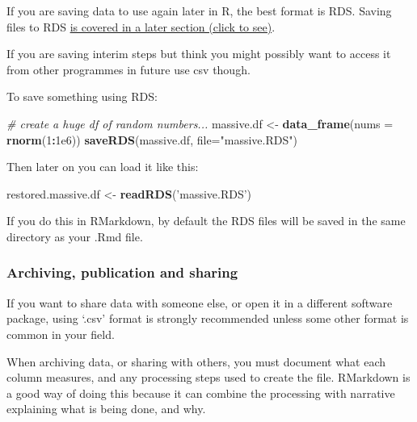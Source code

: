 \documentclass[]{article}
\newenvironment{Shaded}{\begin{snugshade}}{\end{snugshade}}
\newcommand{\CommentTok}[1]{\textcolor[rgb]{0.56,0.35,0.01}{\textit{#1}}}
\newcommand{\DataTypeTok}[1]{\textcolor[rgb]{0.13,0.29,0.53}{#1}}
\newcommand{\DecValTok}[1]{\textcolor[rgb]{0.00,0.00,0.81}{#1}}
\newcommand{\FloatTok}[1]{\textcolor[rgb]{0.00,0.00,0.81}{#1}}
\newcommand{\KeywordTok}[1]{\textcolor[rgb]{0.13,0.29,0.53}{\textbf{#1}}}
\newcommand{\NormalTok}[1]{#1}
\newcommand{\OperatorTok}[1]{\textcolor[rgb]{0.81,0.36,0.00}{\textbf{#1}}}
\newcommand{\StringTok}[1]{\textcolor[rgb]{0.31,0.60,0.02}{#1}}
\begin{document}
If you are saving data to use again later in R, the best format is RDS. Saving
files to RDS \protect\hyperlink{rds-files}{is covered in a later section (click to see)}.

If you are saving interim steps but think you might possibly want to access it
from other programmes in future use csv though.

To save something using RDS:

\begin{Shaded}
\begin{Highlighting}[]
\CommentTok{# create a huge df of random numbers...}
\NormalTok{massive.df <-}\StringTok{ }\KeywordTok{data_frame}\NormalTok{(}\DataTypeTok{nums =} \KeywordTok{rnorm}\NormalTok{(}\DecValTok{1}\OperatorTok{:}\FloatTok{1e6}\NormalTok{))}
\KeywordTok{saveRDS}\NormalTok{(massive.df, }\DataTypeTok{file=}\StringTok{"massive.RDS"}\NormalTok{)}
\end{Highlighting}
\end{Shaded}

Then later on you can load it like this:

\begin{Shaded}
\begin{Highlighting}[]
\NormalTok{restored.massive.df <-}\StringTok{  }\KeywordTok{readRDS}\NormalTok{(}\StringTok{'massive.RDS'}\NormalTok{)}
\end{Highlighting}
\end{Shaded}

{If you do this in RMarkdown, by default the RDS files will be saved in the same
directory as your .Rmd file.}

\hypertarget{archiving-publication-and-sharing}{%
\subsubsection*{Archiving, publication and sharing}\label{archiving-publication-and-sharing}}

If you want to share data with someone else, or open it in a different software
package, using `.csv' format is strongly recommended unless some other format is
common in your field.

When archiving data, or sharing with others, you must document what each column
measures, and any processing steps used to create the file. RMarkdown is a good
way of doing this because it can combine the processing with narrative
explaining what is being done, and why.
\end{document}
